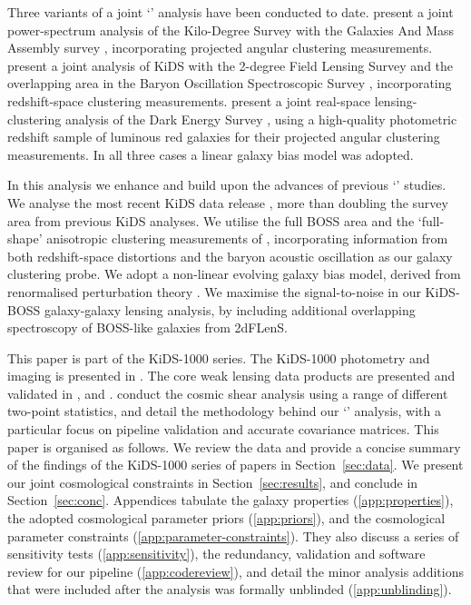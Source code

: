   Three variants of a joint `\tttp' analysis have been
   conducted to date.  \citet{vanuitert/etal:2018} present a joint power-spectrum
   analysis of the Kilo-Degree Survey \citep[KiDS,][]{kuijken/etal:2015} with
   the Galaxies And Mass Assembly survey
   \citep[GAMA,][]{liske/etal:2015}, incorporating projected
   angular clustering measurements.   \citet{joudaki/etal:2018}
   present a joint analysis of KiDS with the
   2-degree Field Lensing Survey \citep[2dFLenS,][]{blake/etal:2016}
   and the overlapping area in the Baryon Oscillation Spectroscopic Survey \citep[BOSS,][]{alam/etal:2015}, incorporating
   redshift-space clustering measurements.  \citet{abbott/etal:2018}
   present a joint real-space lensing-clustering analysis of the Dark
   Energy Survey \citep[DES,][]{drlicawagner/etal:2018}, using a high-quality
   photometric redshift sample of luminous red galaxies for their projected
   angular clustering measurements.  
   In all three cases a
   linear galaxy bias model was adopted. 
   
   In this analysis we enhance and build upon the advances of previous `\tttp' studies.   We analyse the most recent KiDS data release \citep[KiDS-1000,][]{kuijken/etal:2019}, more than doubling the
   survey area from previous KiDS analyses.   We utilise the full BOSS
   area and the `full-shape' anisotropic clustering measurements of \citet{sanchez/etal:2017},
   incorporating information from both redshift-space distortions
   and the baryon acoustic oscillation as our galaxy clustering probe.   We adopt a non-linear
   evolving galaxy bias model, derived from renormalised perturbation theory
   \citep{crocce/scoccimarro:2006, chan/etal:2012}.  
   We maximise the signal-to-noise in our 
   KiDS-BOSS galaxy-galaxy lensing analysis, 
   by including additional overlapping spectroscopy of BOSS-like galaxies from 2dFLenS.

This paper is part of the KiDS-1000 series.  The KiDS-1000 photometry and imaging is presented in \citet{kuijken/etal:2019}.  The core weak lensing data products are presented and validated in \citet[shear measurements,][]{giblin/etal:inprep},  and  \citet[redshift measurements,][]{hildebrandt/etal:inprep}.   \citet{asgari/etal:inprep} conduct the cosmic shear analysis using a range of different two-point statistics, and \citet{joachimi/etal:inprep} detail the methodology behind our `\tttp'  
   analysis, with a particular focus on pipeline validation and accurate covariance matrices.   This paper is organised as follows.   We review the data and provide a concise summary of the findings of the KiDS-1000 series of papers in Section~\ref{sec:data}.   
 We present our joint cosmological constraints in Section~\ref{sec:results}, and conclude in Section~\ref{sec:conc}.  Appendices tabulate the galaxy properties (\ref{app:properties}), the adopted cosmological parameter priors (\ref{app:priors}),  and the cosmological parameter constraints (\ref{app:parameter-constraints}).   They also discuss a series of sensitivity tests (\ref{app:sensitivity}), the redundancy, validation and software review for our pipeline (\ref{app:codereview}), and detail the minor analysis additions that were included after the analysis was formally unblinded (\ref{app:unblinding}).


   











   